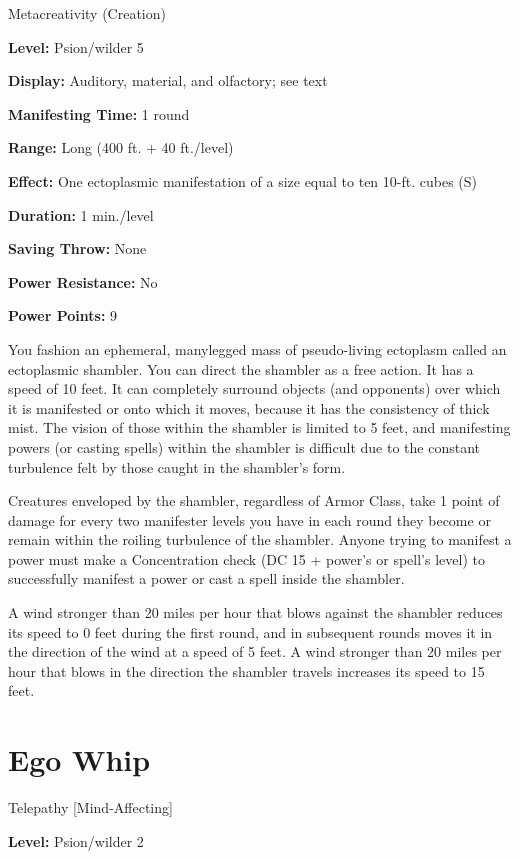 \documentclass{article}
\begin{document}
Metacreativity (Creation)

\textbf{Level:} Psion/wilder 5

\textbf{Display:} Auditory, material, and olfactory; see text

\textbf{Manifesting Time:} 1 round

\textbf{Range:} Long (400 ft. + 40 ft./level)

\textbf{Effect:} One ectoplasmic manifestation of a size equal to ten 10-ft. cubes 
(S)

\textbf{Duration:} 1 min./level

\textbf{Saving Throw:} None

\textbf{Power Resistance:} No

\textbf{Power Points:} 9

You fashion an ephemeral, manylegged mass of pseudo-living ectoplasm called an 
ectoplasmic shambler. You can direct the shambler as a free action. It has a speed 
of 10 feet. It can completely surround objects (and opponents) over which it is 
manifested or onto which it moves, because it has the consistency of thick mist. 
The vision of those within the shambler is limited to 5 feet, and manifesting powers 
(or casting spells) within the shambler is difficult due to the constant turbulence 
felt by those caught in the shambler's form.

Creatures enveloped by the shambler, regardless of Armor Class, take 1 point of 
damage for every two manifester levels you have in each round they become or remain 
within the roiling turbulence of the shambler. Anyone trying to manifest a power 
must make a Concentration check (DC 15 + power's or spell's level) to successfully 
manifest a power or cast a spell inside the shambler.

A wind stronger than 20 miles per hour that blows against the shambler reduces 
its speed to 0 feet during the first round, and in subsequent rounds moves it in 
the direction of the wind at a speed of 5 feet. A wind stronger than 20 miles per 
hour that blows in the direction the shambler travels increases its speed to 15 
feet.

\vspace{12pt}
\section*{Ego Whip}

Telepathy [Mind-Affecting]

\textbf{Level:} Psion/wilder 2
\end{document}
